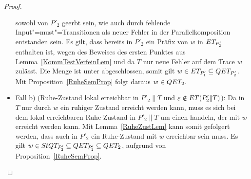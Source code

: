 \begin{proof}
\begin{itemize}
      sowohl von $P'_2$ geerbt sein, wie auch durch fehlende
      Input"=must"=Transitionen als neuer Fehler in der Parallelkomposition
      entstanden sein. Es gilt, dass bereits in $P'_2$ ein Präfix von $w$
      in $ET _{P'_2}$ enthalten ist, wegen des Beweises des ersten Punktes aus
      Lemma~\ref{KommTestVerfeinLem} und da $T$ nur neue Fehler auf dem Trace
      $w$ zulässt. Die Menge \ET{} ist unter \cont{} abgeschlossen, somit gilt
      $w\in ET _{P'_1}\subseteq QET _{P'_2}$. Mit Proposition~\ref{RuheSemProp}
      folgt daraus $w\in QET _2$.
    \item Fall b) (Ruhe-Zustand lokal erreichbar in $P'_2\|T$ und $\varepsilon
      \notin ET (P'_2\|T)$): Da in $T$ nur durch $w$ ein ruhiger Zustand
      erreicht werden kann, muss es sich bei dem lokal erreichbaren
      Ruhe-Zustand in $P'_2\|T$ um einen handeln, der mit $w$ erreicht werden
      kann. Mit Lemma~\ref{RuheZustLem} kann somit gefolgert werden, dass auch
      in $P'_2$ ein Ruhe-Zustand mit $w$ erreichbar sein muss. Es gilt $w\in
      StQT _{P'_2}\subseteq QET _{P'_2}\subseteq QET _2$, aufgrund von
      Proposition~\ref{RuheSemProp}.
  \end{itemize}
\end{proof}

